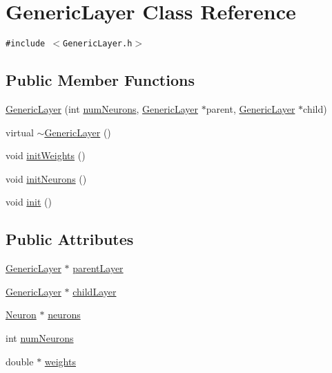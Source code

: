\hypertarget{classGenericLayer}{
\section{GenericLayer Class Reference}
\label{classGenericLayer}
}
{\tt \#include $<$GenericLayer.h$>$}

\subsection*{Public Member Functions}
\begin{CompactItemize}
\item 
\hyperlink{classGenericLayer_03c284e00a6a3e261665f46dff41a9ea}{GenericLayer} (int \hyperlink{classGenericLayer_7b45631903aa50e67fe5a1947fc292bd}{numNeurons}, \hyperlink{classGenericLayer}{GenericLayer} $\ast$parent, \hyperlink{classGenericLayer}{GenericLayer} $\ast$child)
\item 
virtual \hyperlink{classGenericLayer_3abc382b20bf9585dbba35bb325fff90}{$\sim$GenericLayer} ()
\item 
void \hyperlink{classGenericLayer_2e2e170339c48bbcfe05afe9a1f60e43}{initWeights} ()
\item 
void \hyperlink{classGenericLayer_c9357145e80d180b812df7bddeb5139d}{initNeurons} ()
\item 
void \hyperlink{classGenericLayer_716fbf0e6e01271f9ae648dcf1bcccd9}{init} ()
\end{CompactItemize}
\subsection*{Public Attributes}
\begin{CompactItemize}
\item 
\hyperlink{classGenericLayer}{GenericLayer} $\ast$ \hyperlink{classGenericLayer_f936bd9ef0690287bf7ce9fdddaec09d}{parentLayer}
\item 
\hyperlink{classGenericLayer}{GenericLayer} $\ast$ \hyperlink{classGenericLayer_1eb75b8a4e3951ae983f801bb1d8c478}{childLayer}
\item 
\hyperlink{classNeuron}{Neuron} $\ast$ \hyperlink{classGenericLayer_2464f709af50f9def120c1978ed68f24}{neurons}
\item 
int \hyperlink{classGenericLayer_7b45631903aa50e67fe5a1947fc292bd}{numNeurons}
\item 
double $\ast$ \hyperlink{classGenericLayer_01148a903b47b9329e0378274fe5a492}{weights}
\end{CompactItemize}


